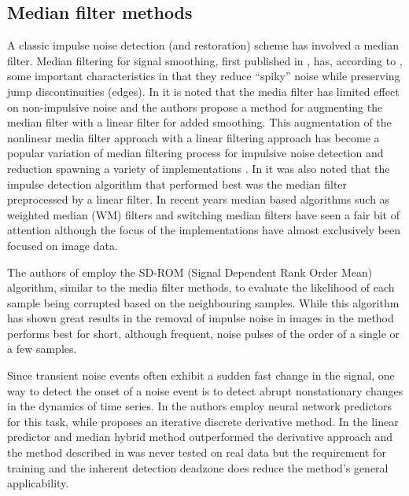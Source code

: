 \subsection{Median filter methods}\label{sec:LitRevDetMedianFilts}
A classic impulse noise detection (and restoration) scheme has involved a median filter\cite{Tukey1974}\cite{Lee1985}\cite{Heinonen1985}\cite{Heinonen1987}\cite{Maekivirta1991}\cite{Kasparis1993}.
Median filtering for signal smoothing, first published in \cite{Tukey1974}, has, according to \cite{Brillinger2002}, some important characteristics in that they reduce ``spiky'' noise while preserving jump discontinuities (edges). In \cite{Lee1985} it is noted that the media filter has limited effect on non-impulsive noise and the authors propose a method for augmenting the median filter with a linear filter for added smoothing. This augmentation of the nonlinear media filter approach with a linear filtering approach has become a popular variation of median filtering process for impulsive noise detection and reduction spawning a variety of implementations \cite{Lee1985}\cite{Heinonen1985}\cite{Nieminen1987}\cite{Kasparis1993}\cite{Loveridge1995}. In \cite{Kauppinen2002} it was also noted that the impulse detection algorithm that performed best was the median filter preprocessed by a linear filter. In recent years median based algorithms such as weighted median (WM) filters \cite{Yin1996}\cite{Wang2010} and switching median filters \cite{Abreu1996}\cite{Chen2000}\cite{Chen2001}\cite{Lin2007} have seen a fair bit of attention although the focus of the implementations have almost exclusively been focused on image data.

The authors of \cite{Chandra1998} employ the SD-ROM (Signal Dependent Rank Order Mean) algorithm, similar to the media filter methods, to evaluate the likelihood of each sample being corrupted based on the neighbouring samples. While this algorithm has shown great results in the removal of impulse noise in images \cite{Abreu1996} in \cite{Chandra1998} the method performs best for short, although frequent, noise pulses of the order of a single or a few samples.

Since transient noise events often exhibit a sudden fast change in the signal, one way to detect the onset of a noise event is to detect abrupt nonstationary changes in the dynamics of time series. In \cite{Fancourt2000} the authors employ neural network predictors for this task, while \cite{Kauppinen2002} proposes an iterative discrete derivative method. In \cite{Kauppinen2002} the linear predictor and median hybrid method outperformed the derivative approach and the method described in \cite{Fancourt2000} was never tested on real data but the requirement for training and the inherent detection deadzone does reduce the method's general applicability.

